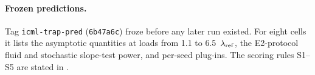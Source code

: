 \paragraph{Frozen predictions.} Tag \texttt{icml-trap-pred} (\texttt{6b47a6c}) froze
 before any later run existed. For eight cells it lists the asymptotic quantities at
loads from 1.1 to 6.5~$\lambda_{\mathrm{ref}}$, the E2-protocol fluid and stochastic slope-test power, and per-seed plug-ins. The scoring
rules S1--S5 are stated in .
